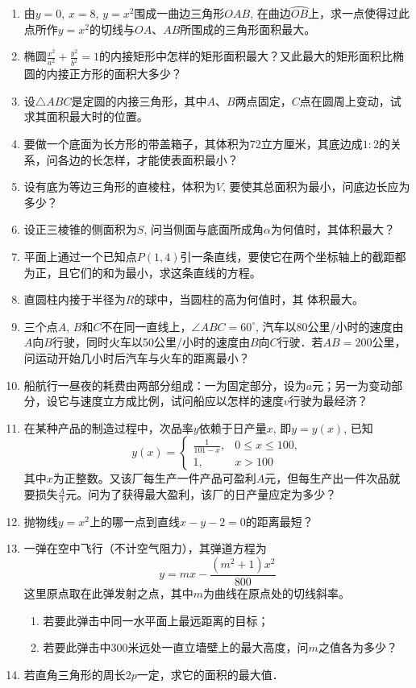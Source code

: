 \begin{ex}
\begin{enumerate}
    \item 由$y=0$, $x=8$, $y=x^2$围成一曲边三角形$OAB$, 在曲边$\wideparen{OB}$上，求一点使得过此点所作$y=x^2$的切线与$OA$、$AB$所围成的三角形面积最大。
    \item 椭圆$\frac{x^2}{a^2}+\frac{y^2}{b^2}=1$的内接矩形中怎样的矩形面积最大？又此最大的矩形面积比椭圆的内接正方形的面积大多少？
    \item 设$\triangle ABC$是定圆的内接三角形，其中$A$、$B$两点固定，$C$点在圆周上变动，试求其面积最大时的位置。
    \item 要做一个底面为长方形的带盖箱子，其体积为72立方厘米，其底边成$1:2$的关系，问各边的长怎样，才能使表面积最小？
    \item 设有底为等边三角形的直棱柱，体积为$V$, 要使其总面积为最小，问底边长应为多少？
    \item 设正三棱锥的侧面积为$S$, 问当侧面与底面所成角$\alpha$为何值时，其体积最大？
    \item 平面上通过一个已知点$P(1, 4)$引一条直线，要使它在两个坐标轴上的截距都为正，且它们的和为最小，求这条直线的方程。
    \item 直圆柱内接于半径为$R$的球中，当圆柱的高为何值时，其
    体积最大。
    \item 三个点$A$, $B$和$C$不在同一直线上，$\angle ABC=60^{\circ}$, 汽车以80公里/小时的速度由$A$向$B$行驶，同时火车以50公里/小时的速度由$B$向$C$行驶．若$AB=200$公里，问运动开始几小时后汽车与火车的距离最小？
    \item 船航行一昼夜的耗费由两部分组成：一为固定部分，设为$a$元；另一为变动部分，设它与速度立方成比例，试问船应以怎样的速度$v$行驶为最经济？
    \item 在某种产品的制造过程中，次品率$y$依赖于日产量$x$, 即$y=y(x)$, 已知
\[y(x)=\begin{cases}
    \frac{1}{101-x},& 0\le x\le 100,\\
    1,& x>100
\end{cases}\]
其中$x$为正整数。又该厂每生产一件产品可盈利$A$元，但每生产出一件次品就要损失$\frac{A}{3}$元。问为了获得最大盈利，该厂的日产量应定为多少？
\item 抛物线$y=x^2$上的哪一点到直线$x-y-2=0$的距离最短？\item 一弹在空中飞行（不计空气阻力），其弹道方程为
\[y=mx-\frac{(m^2+1)x^2}{800}\]
这里原点取在此弹发射之点，其中$m$为曲线在原点处的切线斜率。
\begin{enumerate}
    \item 若要此弹击中同一水平面上最远距离的目标；
    \item 若要此弹击中300米远处一直立墙壁上的最大高度，问$m$之值各为多少？
\end{enumerate}
\item 若直角三角形的周长$2p$一定，求它的面积的最大值．
\end{enumerate}  
\end{ex}

